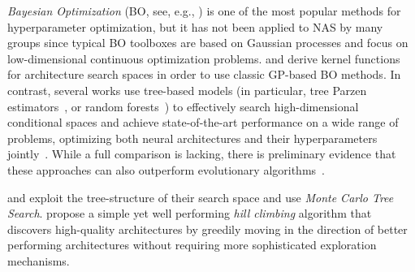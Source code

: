 \documentclass[twoside,11pt]{article}
\renewcommand{\cite}[1]{\citep{#1}}
\newcommand{\book}[1]{#1}
\renewcommand{\book}[1]{}
\begin{document}
\emph{Bayesian Optimization} (BO, see, e.g., \cite{Shahriari_bo}) is one of the most popular methods for hyperparameter optimization\book{ (see also Chapter 1 of this book)}, but it has not been applied to NAS by many groups since typical BO toolboxes are based on Gaussian processes and focus on low-dimensional continuous optimization problems. \citet{SweDuvSnoHutOsb13} and \citet{kandasamy_neural_2018} derive kernel functions for architecture search spaces in order to use classic GP-based BO methods. %
In contrast, several works use tree-based models (in particular, tree Parzen estimators~\citep{Bergstra2011}, or random forests~\citep{hutter-lion11a}) to effectively search high-dimensional conditional spaces and achieve state-of-the-art performance on a wide range of problems, optimizing both neural architectures and their hyperparameters jointly~\cite{Bergstra2013MakingAS,DomSprHut15,mendoza_towards_2016,Zela_AutoML2018}.
While a full comparison is lacking, there is preliminary evidence that these approaches can also outperform evolutionary algorithms~\cite{klein_rml2018}. 

\citet{Negrinho_deeparch} and \citet{wistuba_finding_2017} exploit the tree-structure of their search space and use \emph{Monte Carlo Tree Search}. \citet{elsken_simple_2017} propose a simple yet well performing \emph{hill climbing} algorithm that discovers high-quality architectures by greedily moving in the direction of better performing architectures without requiring more sophisticated exploration mechanisms. 
\end{document}
